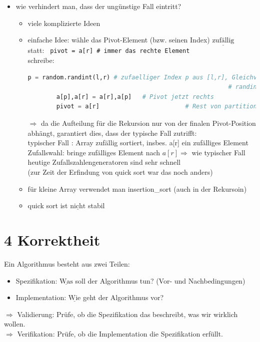 \documentclass[11pt, fleqn]{scrreprt}
\begin{document}
\begin{itemize}
	\item wie verhindert man, dass der ungünstige Fall eintritt? 
	\begin{itemize}
		\item viele komplizierte Ideen
		\item einfache Idee: wähle das Pivot-Element (bzw. seinen Index) $\underline{\text{zufällig}}$ \\
		statt: \verb| pivot = a[r] # immer das rechte Element | \\
		schreibe: 
		\begin{lstlisting}[language=Python]
		p = random.randint(l,r) # zufaelliger Index p aus [l,r], Gleichverteilung 
														# randint: Zufallszahlenmodul in Python
		a[p],a[r] = a[r],a[p] 	# Pivot jetzt rechts 
		pivot = a[r] 						# Rest von partition() wie gehabt
		\end{lstlisting}
		$\Rightarrow$ da die Aufteilung für die Rekursion nur von der finalen Pivot-Position abhängt, garantiert dies, dass der typische Fall zutrifft: \\
		typischer Fall : Array zufällig sortiert, insbes. a[r] ein zufälliges Element \\
		Zufallswahl: bringe zufälliges Element nach $a[r] \Rightarrow$ wie typischer Fall \\
		heutige Zufallszahlengeneratoren sind sehr schnell \\
		(zur Zeit der Erfindung von quick sort war das noch anders)
		\item für kleine Array verwendet man insertion\_sort (auch in der Rekursoin)
		\item quick sort ist $\underline{\text{nicht}}$ stabil
	\end{itemize}
\end{itemize}

\chapter*{4 Korrektheit}

Ein Algorithmus besteht aus zwei Teilen: 
\begin{itemize}
	\item Spezifikation: $\underline{\text{Was}}$ soll der Algorithmus tun? (Vor- und Nachbedingungen)
	\item Implementation: $\underline{\text{Wie}}$ geht der Algorithmus vor?
\end{itemize}
$\Rightarrow$ Validierung: Prüfe, ob die Spezifikation das beschreibt, was wir wirklich wollen. \\
$\Rightarrow$ Verifikation: Prüfe, ob die Implementation die Spezifikation erfüllt. \\
\end{document}
